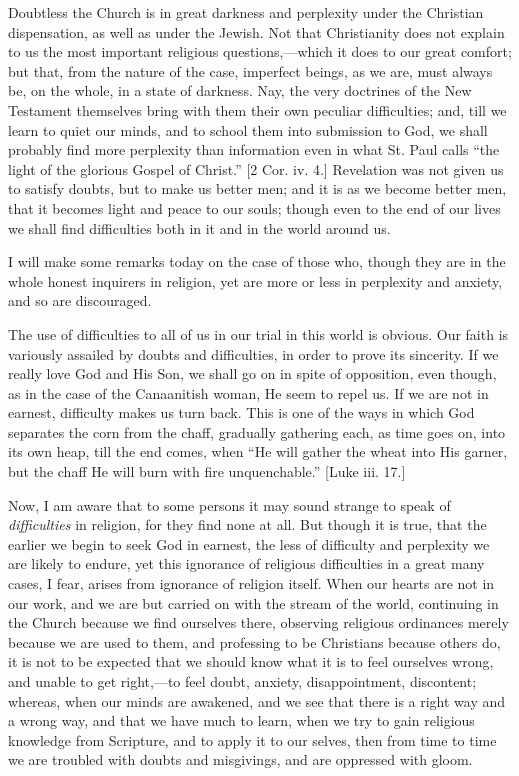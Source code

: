 Doubtless the Church is in great darkness and
perplexity under the Christian dispensation, as well as
under the Jewish. Not that Christianity does not explain
to us the most important religious questions,—which
it does to our great comfort; but that, from the nature
of the case, imperfect beings, as we are, must always be,
on the whole, in a state of darkness. Nay, the very
doctrines of the New Testament themselves bring with them
their own peculiar difficulties; and, till we learn to
quiet our minds, and to school them into submission to
God, we shall probably find more perplexity than
information even in what St. Paul calls ``the light
of the glorious Gospel of Christ.'' [2 Cor. iv. 4.]
Revelation was not given us to satisfy doubts, but to
make us better men; and it is as we become better men,
that it becomes light and peace to our souls; though even
to the end of our lives we shall find difficulties both
in it and in the world around us.

I will make some remarks today on the case of those
who, though they are in the whole honest inquirers in
religion, yet are more or less in perplexity and anxiety,
and so are discouraged.

The use of difficulties to all of us in our trial in
this world is obvious. Our faith is variously assailed by
doubts and difficulties, in order to prove its sincerity.
If we really love God and His Son, we shall go on in
spite of opposition, even though, as in the case of the
Canaanitish woman, He seem to repel us. If we are not in
earnest, difficulty makes us turn back. This is one of
the ways in which God separates the corn from the chaff,
gradually gathering each, as time goes on, into its own
heap, till the end comes, when ``He will gather the
wheat into His garner, but the chaff He will burn with
fire unquenchable.'' [Luke iii. 17.]

Now, I am aware that to some persons it may sound
strange to speak of \emph{difficulties} in religion, for
they find none at all. But though it is true, that the
earlier we begin to seek God in earnest, the less of
difficulty and perplexity we are likely to endure, yet
this ignorance of religious difficulties in a great many
cases, I fear, arises from ignorance of religion itself.
When our hearts are not in our work, and we are but
carried on with the stream of the world, continuing in
the Church because we find ourselves there, observing
religious ordinances merely because we are used to them,
and professing to be Christians because others do, it is
not to be expected that we should know what it is to feel
ourselves wrong, and unable to get right,—to feel
doubt, anxiety, disappointment, discontent; whereas, when
our minds are awakened, and we see that there is a right
way and a wrong way, and that we have much to learn, when
we try to gain religious knowledge from Scripture, and to
apply it to our selves, then from time to time we are
troubled with doubts and misgivings, and are oppressed
with gloom.

